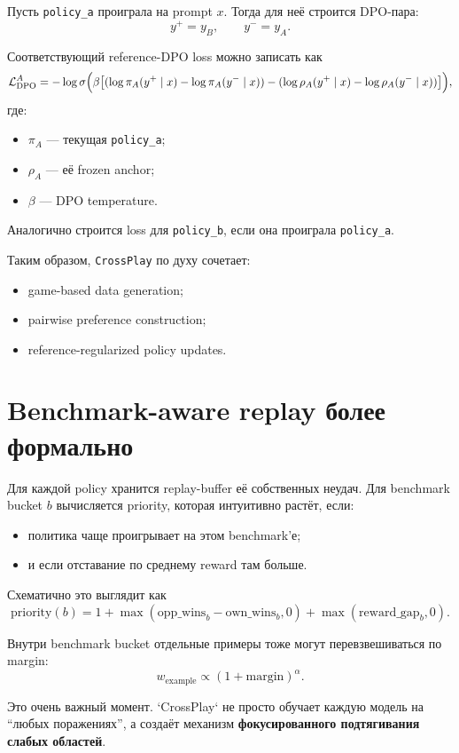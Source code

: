 \documentclass[11pt,a4paper]{article}
\begin{document}
Пусть \texttt{policy\_a} проиграла на prompt $x$. Тогда для неё строится DPO-пара:
\[
y^+ = y_B,\qquad y^- = y_A.
\]

Соответствующий reference-DPO loss можно записать как
\[
\mathcal L_{\mathrm{DPO}}^A
=
-
\log \sigma \Bigl(
\beta
\bigl[
(\log \pi_A(y^+ \mid x)-\log \pi_A(y^- \mid x))
-
(\log \rho_A(y^+ \mid x)-\log \rho_A(y^- \mid x))
\bigr]
\Bigr),
\]
где:
\begin{itemize}
  \item $\pi_A$ --- текущая \texttt{policy\_a};
  \item $\rho_A$ --- её frozen anchor;
  \item $\beta$ --- DPO temperature.
\end{itemize}

Аналогично строится loss для \texttt{policy\_b}, если она проиграла \texttt{policy\_a}.

Таким образом, \texttt{CrossPlay} по духу сочетает:
\begin{itemize}
  \item game-based data generation;
  \item pairwise preference construction;
  \item reference-regularized policy updates.
\end{itemize}

\section{Benchmark-aware replay более формально}

Для каждой policy хранится replay-buffer её собственных неудач. Для benchmark bucket $b$ вычисляется priority, которая интуитивно растёт, если:
\begin{itemize}
  \item политика чаще проигрывает на этом benchmark'е;
  \item и если отставание по среднему reward там больше.
\end{itemize}

Схематично это выглядит как
\[
\mathrm{priority}(b)
=
1
+
\max(\mathrm{opp\_wins}_b-\mathrm{own\_wins}_b,0)
+
\max(\mathrm{reward\_gap}_b,0).
\]

Внутри benchmark bucket отдельные примеры тоже могут перевзвешиваться по margin:
\[
w_{\mathrm{example}} \propto (1+\mathrm{margin})^\alpha.
\]

Это очень важный момент. `CrossPlay` не просто обучает каждую модель на ``любых поражениях'', а создаёт механизм \textbf{фокусированного подтягивания слабых областей}.
\end{document}
